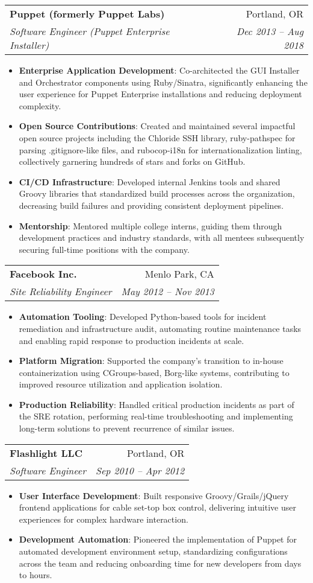 \documentclass[letterpaper,11pt]{article}
\makeatletter
\newcommand{\resumeItem}[2]{
\item[\textsc{}]\small{
    \textbf{#1}{: #2 \vspace{-2pt}}
  }
}
\newcommand{\resumeSubheading}[4]{
  \vspace{-1pt}\item
    \begin{tabular*}{0.97\textwidth}[t]{l@{\extracolsep{\fill}}r}
      \textbf{#1} & #2 \\
      \textit{\small#3} & \textit{\small #4} \\
    \end{tabular*}\vspace{-5pt}
}
\newcommand{\resumeItemListStart}{\begin{itemize}}
\newcommand{\resumeItemListEnd}{\end{itemize}\vspace{-5pt}}
\makeatother
\begin{document}
    \resumeSubheading
      {Puppet (formerly Puppet Labs)}{Portland, OR}
      {Software Engineer (Puppet Enterprise Installer)}{Dec 2013 -- Aug 2018}
      \resumeItemListStart
        \resumeItem{Enterprise Application Development}
          {Co-architected the GUI Installer and Orchestrator components using Ruby/Sinatra, significantly enhancing the user experience for Puppet Enterprise installations and reducing deployment complexity.}
        \resumeItem{Open Source Contributions}
          {Created and maintained several impactful open source projects including the Chloride SSH library, ruby-pathspec for parsing .gitignore-like files, and rubocop-i18n for internationalization linting, collectively garnering hundreds of stars and forks on GitHub.}
        \resumeItem{CI/CD Infrastructure}
          {Developed internal Jenkins tools and shared Groovy libraries that standardized build processes across the organization, decreasing build failures and providing consistent deployment pipelines.}
        \resumeItem{Mentorship}
          {Mentored multiple college interns, guiding them through development practices and industry standards, with all mentees subsequently securing full-time positions with the company.}
      \resumeItemListEnd

    \resumeSubheading
      {Facebook Inc.}{Menlo Park, CA}
      {Site Reliability Engineer}{May 2012 -- Nov 2013}
      \resumeItemListStart
        \resumeItem{Automation Tooling}
          {Developed Python-based tools for incident remediation and infrastructure audit, automating routine maintenance tasks and enabling rapid response to production incidents at scale.}
        \resumeItem{Platform Migration}
          {Supported the company's transition to in-house containerization using CGroups-based, Borg-like systems, contributing to improved resource utilization and application isolation.}
        \resumeItem{Production Reliability}
          {Handled critical production incidents as part of the SRE rotation, performing real-time troubleshooting and implementing long-term solutions to prevent recurrence of similar issues.}
      \resumeItemListEnd

    \resumeSubheading
      {Flashlight LLC}{Portland, OR}
      {Software Engineer}{Sep 2010 -- Apr 2012}
      \resumeItemListStart
        \resumeItem{User Interface Development}
          {Built responsive Groovy/Grails/jQuery frontend applications for cable set-top box control, delivering intuitive user experiences for complex hardware interaction.}
        \resumeItem{Development Automation}
          {Pioneered the implementation of Puppet for automated development environment setup, standardizing configurations across the team and reducing onboarding time for new developers from days to hours.}
      \resumeItemListEnd
\end{document}
